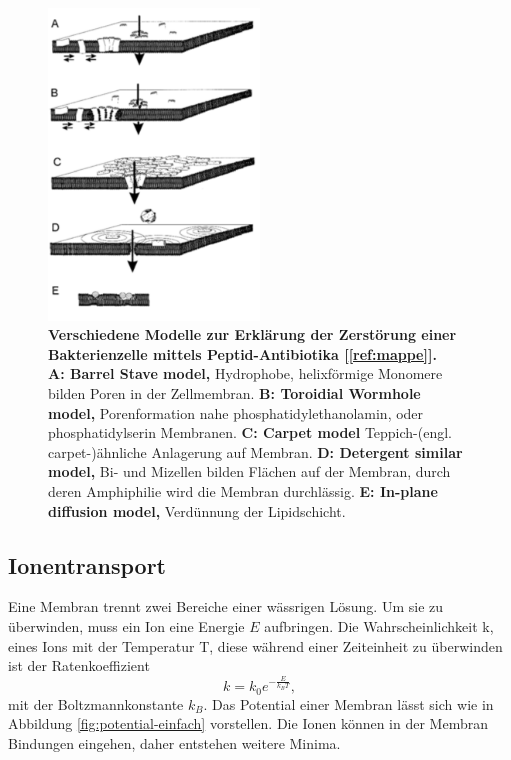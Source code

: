 \documentclass[a4paper,ngerman]{scrartcl}
\begin{document}
\begin{figure}
\includegraphics[width=0.5\textwidth]{abbildungen/wirkmechanismus.png}
\caption{\textbf{Verschiedene Modelle zur Erklärung der Zerstörung einer Bakterienzelle mittels Peptid-Antibiotika [\ref{ref:mappe}].}\\
\textbf{A: Barrel Stave model,} 
Hydrophobe, helixförmige Monomere bilden Poren in der Zellmembran.
\textbf{B: Toroidial Wormhole model,}  
Porenformation nahe phosphatidylethanolamin, oder phosphatidylserin Membranen. 
\textbf{C: Carpet model}  
Teppich-(engl. carpet-)ähnliche Anlagerung auf Membran.
\textbf{D:  Detergent similar model,}
Bi- und Mizellen bilden Flächen auf der Membran, durch deren Amphiphilie wird die Membran durchlässig.
\textbf{E:  In-plane diffusion model,}
Verdünnung der Lipidschicht.
}
\label{fig:wirkmechanismus}
\end{figure}


\subsection{Ionentransport}

Eine Membran trennt zwei Bereiche einer wässrigen Lösung. Um sie zu überwinden, muss ein Ion eine Energie $E$ aufbringen. Die  Wahrscheinlichkeit k, eines Ions mit der Temperatur T, diese während einer Zeiteinheit zu überwinden ist der Ratenkoeffizient
\begin{equation} \label{eqn:rate}
k = k_0 e^{-\frac{E}{k_B T}},
\end{equation}
mit der Boltzmannkonstante $k_{B}$. Das Potential einer Membran lässt sich wie in Abbildung \ref{fig:potential-einfach} vorstellen. Die Ionen können in der Membran Bindungen eingehen, daher entstehen weitere Minima.
\end{document}
